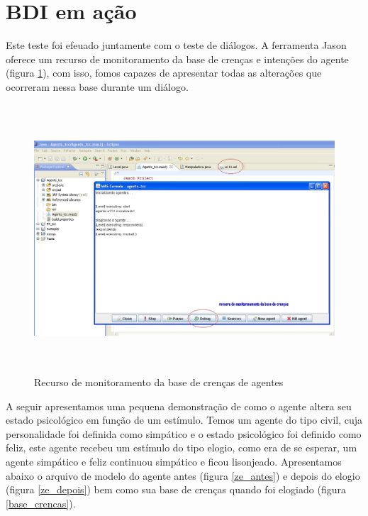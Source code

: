 \section{BDI em ação}
Este teste foi efeuado juntamente com o teste de diálogos. A ferramenta Jason oferece um recurso de monitoramento da base de crenças e intenções do agente (figura \ref{debug}), com isso, fomos capazes de apresentar todas as alterações que ocorreram nessa base durante um diálogo.
\begin{figure}
\centering
\includegraphics [height=10cm]{figuras/rodando_elogio_jose.jpg}
\caption{Recurso de monitoramento da base de crenças de agentes}
\label{debug}
\end{figure}

A seguir apresentamos uma pequena demonstração de como o agente altera seu estado psicológico em função de um estímulo.
Temos um agente do tipo civil, cuja personalidade foi definida como simpático e o estado psicológico foi definido como feliz, este agente recebeu um estímulo do tipo elogio, como era de se esperar, um agente simpático e feliz continuou simpático e ficou lisonjeado. Apresentamos abaixo o arquivo de modelo do agente antes (figura \ref{ze_antes}) e depois do elogio (figura \ref{ze_depois}) bem como sua base de crenças quando foi elogiado (figura \ref{base_crencas}).

